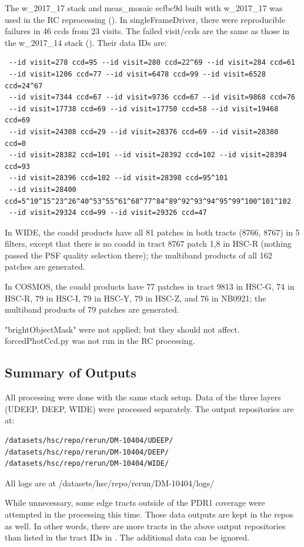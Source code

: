 \documentclass[DM,authoryear,toc]{lsstdoc}
\begin{document}
The w{\_}2017{\_}17 stack and meas{\_}mosaic ecfbc9d built with w{\_}2017{\_}17 was used in the RC reprocessing ().
In singleFrameDriver, there were reproducible failures in 46 ccds from 23 visits. The failed visit/ccds are the same as those in the w{\_}2017{\_}14 stack (). Their data IDs are:
\begin{verbatim}
 --id visit=278 ccd=95 --id visit=280 ccd=22^69 --id visit=284 ccd=61
 --id visit=1206 ccd=77 --id visit=6478 ccd=99 --id visit=6528 ccd=24^67
 --id visit=7344 ccd=67 --id visit=9736 ccd=67 --id visit=9868 ccd=76
 --id visit=17738 ccd=69 --id visit=17750 ccd=58 --id visit=19468 ccd=69
 --id visit=24308 ccd=29 --id visit=28376 ccd=69 --id visit=28380 ccd=0
 --id visit=28382 ccd=101 --id visit=28392 ccd=102 --id visit=28394 ccd=93
 --id visit=28396 ccd=102 --id visit=28398 ccd=95^101
 --id visit=28400 ccd=5^10^15^23^26^40^53^55^61^68^77^84^89^92^93^94^95^99^100^101^102
 --id visit=29324 ccd=99 --id visit=29326 ccd=47
\end{verbatim}

In WIDE, the coadd products have all 81 patches in both tracts (8766, 8767) in 5 filters, except that there is no coadd in tract 8767 patch 1,8 in HSC-R (nothing passed the PSF quality selection there); the multiband products of all 162 patches are generated.

In COSMOS, the coadd products have 77 patches in tract 9813 in HSC-G, 74 in HSC-R, 79 in HSC-I, 79 in HSC-Y, 79 in HSC-Z, and 76 in NB0921; the multiband products of 79 patches are generated.

"brightObjectMask" were not applied; but they should not affect. forcedPhotCcd.py was not run in the RC processing.

\subsection{Summary of Outputs} \label{summaryOutputs}
All processing were done with the same stack setup. Data of the three layers (UDEEP, DEEP, WIDE) were processed separately.
The output repositories are at:
\begin{verbatim}
/datasets/hsc/repo/rerun/DM-10404/UDEEP/
/datasets/hsc/repo/rerun/DM-10404/DEEP/
/datasets/hsc/repo/rerun/DM-10404/WIDE/
\end{verbatim}
All logs are at /datasets/hsc/repo/rerun/DM-10404/logs/

While unnecessary, some edge tracts outside of the PDR1 coverage were attempted in the processing this time. Those data outputs are kept in the repos as well. In other words, there are more tracts in the above output repositories than listed in the tract IDs in . The additional data can be ignored.
\end{document}
